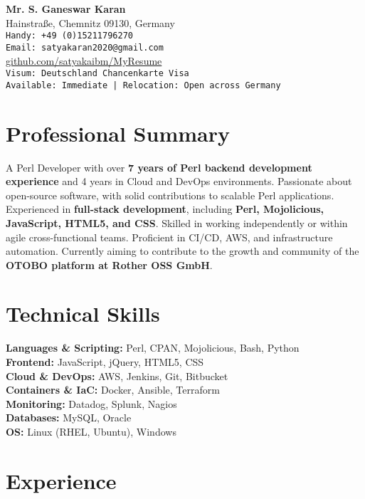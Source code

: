 \documentclass[11pt,a4paper]{article}
\begin{document}
\begin{itemize}[leftmargin=*]
{\LARGE \textbf{Mr. S. Ganeswar Karan}} \\
Hainstraße, Chemnitz 09130, Germany \\
\texttt{Handy: +49 (0)15211796270} \\
\texttt{Email: satyakaran2020@gmail.com} \\
\href{https://github.com/satyakaibm/MyResume/tree/master/Perl_Developer}{github.com/satyakaibm/MyResume} \\
\texttt{Visum: Deutschland Chancenkarte Visa} \\
\texttt{Available: Immediate | Relocation: Open across Germany} \\
\end{itemize}

\section*{Professional Summary}
A Perl Developer with over \textbf{7 years of Perl backend development experience} and 4 years in Cloud and DevOps environments. 
Passionate about open-source software, with solid contributions to scalable Perl applications. 
Experienced in \textbf{full-stack development}, including \textbf{Perl, Mojolicious, JavaScript, HTML5, and CSS}. 
Skilled in working independently or within agile cross-functional teams. Proficient in CI/CD, AWS, and infrastructure automation. 
Currently aiming to contribute to the growth and community of the \textbf{OTOBO platform at Rother OSS GmbH}.

\section*{Technical Skills}
\textbf{Languages \& Scripting:} Perl, CPAN, Mojolicious, Bash, Python \\
\textbf{Frontend:} JavaScript, jQuery, HTML5, CSS \\
\textbf{Cloud \& DevOps:} AWS, Jenkins, Git, Bitbucket \\
\textbf{Containers \& IaC:} Docker, Ansible, Terraform \\
\textbf{Monitoring:} Datadog, Splunk, Nagios \\
\textbf{Databases:} MySQL, Oracle \\
\textbf{OS:} Linux (RHEL, Ubuntu), Windows

\section*{Experience}
\end{document}
